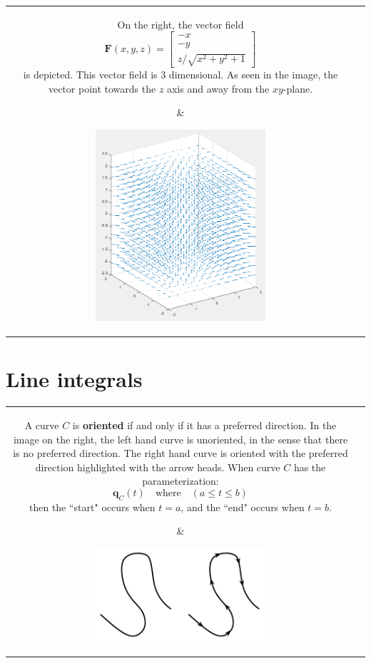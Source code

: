 \documentclass{article}
\begin{document}
\begin{tabular}{cc}
\parbox{0.5\textwidth}{
On the right, the vector field 
\[\mathbf{F}(x,y,z) = \begin{bmatrix} -x \\ -y \\ z/\sqrt{x^2 + y^2 + 1} \end{bmatrix}\]
is depicted. This vector field is 3 dimensional. As seen in the image, the vector point towards the \(z\) axis and away from the \(xy\)-plane.
} & \parbox{0.5\textwidth}{
\includegraphics[width = 0.5\textwidth]{example_vector_field_8}
}
\end{tabular}




\section*{Line integrals}

\begin{tabular}{cc}
\parbox{0.5\textwidth}{
A curve \(C\) is {\bf oriented} if and only if it has a preferred direction. In the image on the right, the left hand curve is unoriented, in the sense that there is no preferred direction. The right hand curve is oriented with the preferred direction highlighted with the arrow heads. When curve \(C\) has the parameterization:
\[\mathbf{q}_C(t) \quad\text{where}\quad (a \leq t \leq b)\]
then the ``start" occurs when \(t = a\), and the ``end" occurs when \(t = b\).
} & \parbox{0.5\textwidth}{
\includegraphics[width = 0.5\textwidth]{unoriented_vs_oriented_curves}
}
\end{tabular}
\end{document}
